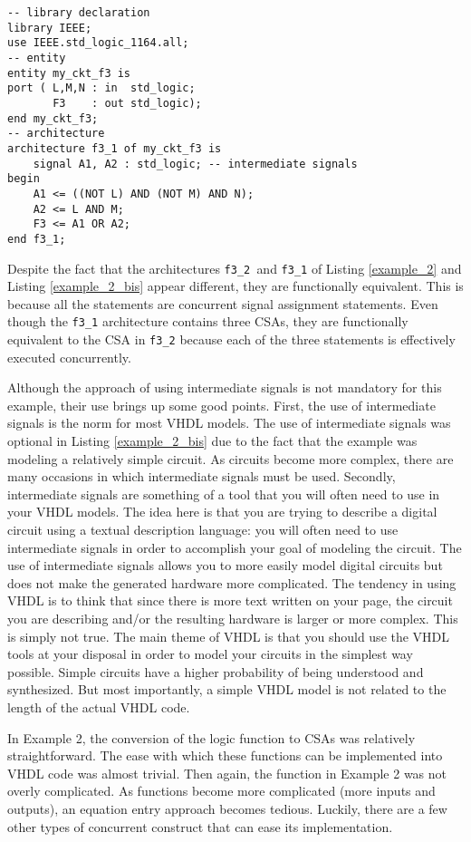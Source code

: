 \begin{lstlisting}[float, label=example_2_bis, caption=Alternative solution of Example 2.]
-- library declaration
library IEEE;
use IEEE.std_logic_1164.all;
-- entity
entity my_ckt_f3 is
port ( L,M,N : in  std_logic;
       F3    : out std_logic);
end my_ckt_f3;
-- architecture
architecture f3_1 of my_ckt_f3 is
	signal A1, A2 : std_logic; -- intermediate signals
begin
	A1 <= ((NOT L) AND (NOT M) AND N);
	A2 <= L AND M;
	F3 <= A1 OR A2;
end f3_1;
\end{lstlisting}

Despite the fact that the architectures \texttt{f3\_2 }and \texttt{f3\_1} of Listing \ref{example_2} and Listing \ref{example_2_bis} appear different, they are functionally equivalent. This is because all the statements are concurrent signal assignment statements. Even though the \texttt{f3\_1} architecture contains three CSAs, they are functionally equivalent to the CSA in \texttt{f3\_2} because each of the three statements is effectively executed concurrently.

Although the approach of using intermediate signals is not mandatory for this example, their use brings up some good points. First, the use of intermediate signals is the norm for most VHDL models. The use of intermediate signals was optional in Listing \ref{example_2_bis} due to the fact that the example was modeling a relatively simple circuit. As circuits become more complex, there are many occasions in which intermediate signals must be used. Secondly, intermediate signals are something of a tool that you will often need to use in your VHDL models. The idea here is that you are trying to describe a digital circuit using a textual description language: you will often need to use intermediate signals in order to accomplish your goal of modeling the circuit. The use of intermediate signals allows you to more easily model digital circuits but does not make the generated hardware more complicated. The tendency in using VHDL is to think that since there is more text written on your page, the circuit you are describing and/or the resulting hardware is larger or more complex. This is simply not true. The main theme of VHDL is that you should use the VHDL tools at your disposal in order to model your circuits in the simplest way possible. Simple circuits have a higher probability of being understood and synthesized. But most importantly, a simple VHDL model is not related to the length of the actual VHDL code.

In Example 2, the conversion of the logic function to CSAs was relatively straightforward. The ease with which these functions can be implemented into VHDL code was almost trivial. Then again, the function in Example 2 was not overly complicated. As functions become more complicated (more inputs and outputs), an equation entry approach becomes tedious. Luckily, there are a few other types of concurrent construct that can ease its implementation.

